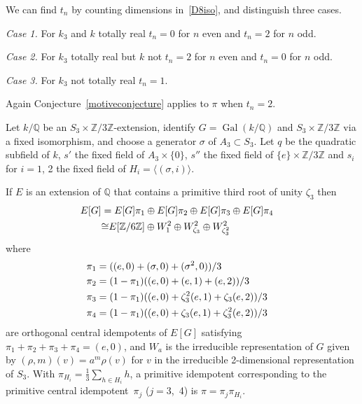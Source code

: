 \documentclass{amsart}
\begin{document}
\begin{example}
We can find $ t_n $ by counting dimensions in~\eqref{D8iso}, and distinguish three cases.

{\it Case 1.\/}
For $ k_3 $ and $ k $ totally real $ t_n =0 $ for $ n $ even and $ t_n=2 $ for $ n $ odd.

{\it Case 2.\/}
For $ k_3 $ totally real but $ k $ not $ t_n=2 $ for $ n $ even and $ t_n=0 $ for $ n $ odd.

{\it Case 3.\/}
For $ k_3 $ not totally real $ t_n=1 $.

\noindent
Again Conjecture~\ref{motiveconjecture} applies to $ \pi $ when $ t_n = 2 $.
\end{example}

\begin{example}\label{sexticexample}
Let $ k/{\mathbb Q} $ be an $ S_3 \times {\mathbb Z}/3{\mathbb Z} $-extension, identify $ G = {\operatorname{Gal}}(k/{\mathbb Q}) $ and $ S_3 \times {\mathbb Z}/3{\mathbb Z} $
via a fixed isomorphism, and choose a generator $ {\sigma} $ of $ A_3 \subset S_3 $.
Let $ q $ be the quadratic subfield of $ k $, $ s' $ the fixed field of $ A_3 \times \{0\} $,
$ s'' $ the fixed field of $ \{e\} \times {\mathbb Z}/3{\mathbb Z} $ and $ s_i $ for $ i=1 $, 2 the fixed field of
$ H_i = \langle ({\sigma},i) \rangle $.

If $ E $ is an extension of $ {\mathbb Q} $ that contains a primitive third root of unity $ {\zeta}_3 $ then
\begin{equation}\label{sexticEGdecomp}
\begin{aligned}
   E[G] & = E[G] \pi_1 \oplus E[G] \pi_2 \oplus E[G] \pi_3 \oplus E[G] \pi_4
\cr
        & {\cong} E[{\mathbb Z}/6{\mathbb Z}] \oplus W_1^2 \oplus W_{{\zeta}_3}^2 \oplus W_{{\zeta}_3^2}^2 
\end{aligned}
\end{equation}
where
\begin{equation*}
\begin{aligned}
\pi_1 & = ((e,0) + ({\sigma},0) + ({\sigma}^2,0))/3 
\cr
\pi_2 & = (1-\pi_1)((e,0)+(e,1)+(e,2))/3
\cr
\pi_3 & = (1-\pi_1)((e,0)+{\zeta}_3^2(e,1)+{\zeta}_3(e,2))/3
\cr
\pi_4 & = (1-\pi_1)((e,0)+{\zeta}_3(e,1)+{\zeta}_3^2(e,2))/3 
\end{aligned}
\end{equation*}
are orthogonal central idempotents of $ E[G] $ satisfying $ \pi_1 + \pi_2 + \pi_3 + \pi_4 = (e,0) $, and
$ W_a  $ is the irreducible representation of $ G $ given by $ ({\rho},m)(v) = a^m {\rho}(v) $ for
$ v $ in the irreducible 2-dimensional representation of $ S_3 $.
With $ \pi_{H_i} = \frac13 \sum_{h \in H_i} h $, a primitive idempotent corresponding to the
primitive central idempotent~$ \pi_j $ ($ j=3 $,~4) is $ \pi = \pi_j \pi_{H_i} $.


\end{example}
\end{document}
